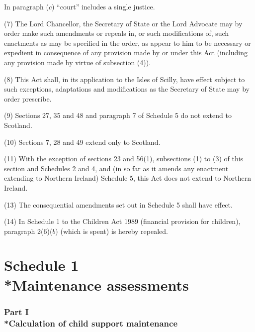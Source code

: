 \documentclass[12pt,a4paper]{article}
\begin{document}
In paragraph ($c$)  “court” includes a single justice.

(7) The Lord Chancellor, the Secretary of State or the Lord Advocate may by order make such amendments or repeals in, or such modifications of, such enactments as may be specified in the order, as appear to him to be necessary or expedient in consequence of any provision made by or under this Act (including any provision made by virtue of subsection (4)).

(8) This Act shall, in its application to the Isles of Scilly, have effect subject to such exceptions, adaptations and modifications as the Secretary of State may by order prescribe.

(9) Sections 27, 35 and 48 and paragraph 7 of Schedule 5 do not extend to Scotland.

(10) Sections 7, 28 and 49 extend only to Scotland.

(11) With the exception of sections 23 and 56(1), subsections (1)  to (3)  of this section and Schedules 2 and 4, and (in so far as it amends any enactment extending to Northern Ireland) Schedule 5, this Act does not extend to Northern Ireland.


(13) The consequential amendments set out in Schedule 5 shall have effect.

(14) In Schedule 1 to the Children Act 1989 (financial provision for children), paragraph 2(6)($b$)  (which is spent) is hereby repealed.


\bigskip

\small

\part[Schedule 1 --- Maintenance assessments]{Schedule 1\\*Maintenance assessments}

\section[Part I --- Calculation of child support maintenance]{Part I\\*Calculation of child support maintenance}
\end{document}
